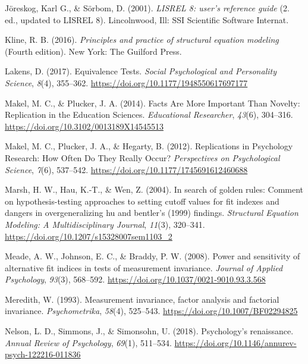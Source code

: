 \documentclass[
  man]{apa6}
\newlength{\cslhangindent}
\newlength{\cslentryspacingunit} %
\newenvironment{CSLReferences}[2] %
 {%
  \setlength{\parindent}{0pt}
  \ifodd #1
  \let\oldpar\par
  \def\par{\hangindent=\cslhangindent\oldpar}
  \fi
  \setlength{\parskip}{#2\cslentryspacingunit}
 }%
 {}
\begin{document}
\begin{CSLReferences}{1}{0}
\leavevmode{}%
Jöreskog, Karl G., \& Sörbom, D. (2001). \emph{LISREL 8: user's reference guide} (2. ed., updated to LISREL 8). Lincolnwood, Ill: SSI Scientific Software Internat.

\leavevmode{}%
Kline, R. B. (2016). \emph{Principles and practice of structural equation modeling} (Fourth edition). New York: The Guilford Press.

\leavevmode{}%
Lakens, D. (2017). Equivalence Tests. \emph{Social Psychological and Personality Science}, \emph{8}(4), 355--362. \url{https://doi.org/10.1177/1948550617697177}

\leavevmode{}%
Makel, M. C., \& Plucker, J. A. (2014). Facts Are More Important Than Novelty: Replication in the Education Sciences. \emph{Educational Researcher}, \emph{43}(6), 304--316. \url{https://doi.org/10.3102/0013189X14545513}

\leavevmode{}%
Makel, M. C., Plucker, J. A., \& Hegarty, B. (2012). Replications in Psychology Research: How Often Do They Really Occur? \emph{Perspectives on Psychological Science}, \emph{7}(6), 537--542. \url{https://doi.org/10.1177/1745691612460688}

\leavevmode{}%
Marsh, H. W., Hau, K.-T., \& Wen, Z. (2004). In search of golden rules: Comment on hypothesis-testing approaches to setting cutoff values for fit indexes and dangers in overgeneralizing hu and bentler's (1999) findings. \emph{Structural Equation Modeling: A Multidisciplinary Journal}, \emph{11}(3), 320--341. \url{https://doi.org/10.1207/s15328007sem1103_2}

\leavevmode{}%
Meade, A. W., Johnson, E. C., \& Braddy, P. W. (2008). Power and sensitivity of alternative fit indices in tests of measurement invariance. \emph{Journal of Applied Psychology}, \emph{93}(3), 568--592. \url{https://doi.org/10.1037/0021-9010.93.3.568}

\leavevmode{}%
Meredith, W. (1993). Measurement invariance, factor analysis and factorial invariance. \emph{Psychometrika}, \emph{58}(4), 525--543. \url{https://doi.org/10.1007/BF02294825}

\leavevmode{}%
Nelson, L. D., Simmons, J., \& Simonsohn, U. (2018). Psychology's renaissance. \emph{Annual Review of Psychology}, \emph{69}(1), 511--534. \url{https://doi.org/10.1146/annurev-psych-122216-011836}


\end{CSLReferences}
\end{document}
